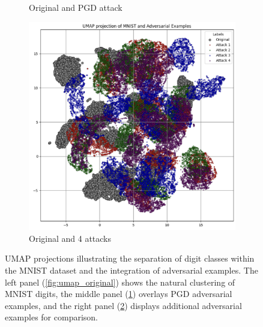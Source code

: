 \documentclass[10pt, conference, a4paper, final]{IEEEtran}
\begin{document}
\begin{figure}[!ht]
\begin{subfigure}{.34\textwidth}
        \caption{Original and PGD attack}
        \label{fig:umap_pgd}
    \end{subfigure}%
    \hfill
    \begin{subfigure}{.28\textwidth}
        \centering
        \includegraphics[width=\linewidth]{paper_images/UMAP_adversary.png}
        \caption{Original and 4 attacks}
        \label{fig:umap_additional_adv}
    \end{subfigure}
    \caption{UMAP projections illustrating the separation of digit classes within the MNIST dataset and the integration of adversarial examples.
     The left panel (\ref{fig:umap_original}) shows the natural clustering of MNIST digits, the middle panel (\ref{fig:umap_pgd}) overlays PGD 
     adversarial examples, and the right panel (\ref{fig:umap_additional_adv}) displays additional adversarial examples for comparison.}
    \label{fig:umap}
\end{figure}
\end{document}
